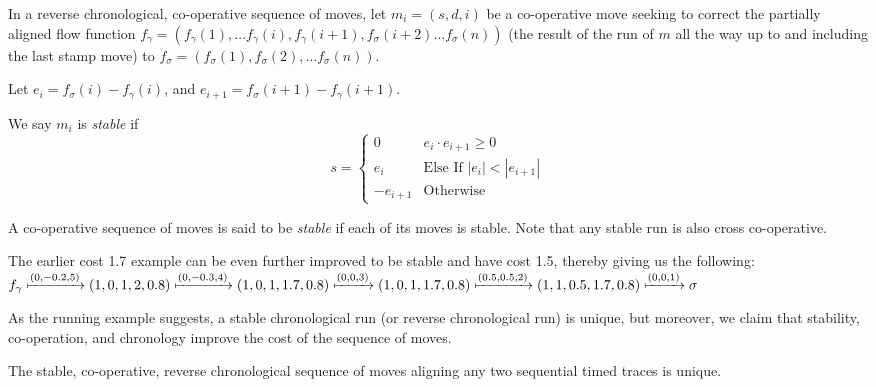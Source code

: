 \documentclass[runningheads]{llncs}
\newcounter{cases}
\begin{document}
    \begin{definition}[Stability]
        In a reverse chronological, co-operative sequence of moves, let  ${m_i = (s, d, i)}$ be a co-operative move seeking to correct the partially aligned flow function $f_\gamma = (f_\gamma(1), \dots f_\gamma(i), f_\gamma(i+1), f_\sigma(i+2) \dots f_\sigma(n))$ (the result of the run of $m$ all the way up to and including the last stamp move) to $f_\sigma = (f_\sigma(1), f_\sigma(2), \dots f_\sigma(n))$. 
        
        Let $e_i = f_\sigma(i) - f_\gamma(i)$, and $e_{i+1} = f_\sigma(i+1) - f_\gamma(i+1)$. 
        
        We say $m_i$ is \textit{stable} if 
        $$s = \begin{cases}
            0 & e_i\cdot e_{i+1} \geq 0 \\
            e_i & \textrm{Else If }|e_i| < |e_{i+1}| \\
            -e_{i+1} & \textrm{Otherwise}
        \end{cases}$$
    \end{definition}
    
    A co-operative sequence of moves is said to be \textit{stable} if each of its moves is stable.
    Note that any stable run is also cross co-operative. 
    
        \begin{example}
        The earlier cost 1.7 example can be even further improved to be stable and have cost 1.5, thereby giving us the following:
    $f_\gamma \xmapsto{(0, -0.2, 5)} (1, 0, 1, 2, 0.8) \xmapsto{(0, -0.3, 4)} (1, 0, 1, 1.7, 0.8) \xmapsto{(0, 0, 3)} (1, 0, 1, 1.7, 0.8) \xmapsto{(0.5, 0.5, 2)} (1, 1, 0.5, 1.7, 0.8) \xmapsto{(0, 0, 1)} \sigma $
        
    \end{example}
    
    As the running example suggests, a stable chronological run (or reverse chronological run) is unique, but moreover, we claim that stability, co-operation, and chronology improve the cost of the sequence of moves.  
    
    \begin{lemma}\label{stableunique} The stable, co-operative, reverse chronological sequence of moves aligning any two sequential timed traces is unique. 
    \end{lemma}
    
    
\end{document}
